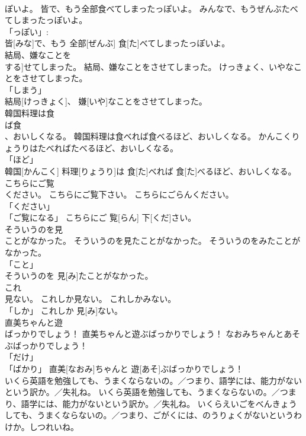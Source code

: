 \documentclass[8pt]{extreport}
\begin{document}
\begin{CJK}{UTF8}{min}
\\	ぽいよ。	皆で、もう全部食べてしまったっぽいよ。	みんなで、もうぜんぶたべてしまったっぽいよ。	
\\	「っぽい」: 
\\	皆[みな]で、もう 全部[ぜんぶ] 食[た]べてしまったっぽいよ。		
\\	結局、嫌なことを
\\	する]せてしまった。	結局、嫌なことをさせてしまった。	けっきょく、いやなことをさせてしまった。	
\\	「しまう」 
\\	結局[けっきょく]、 嫌[いや]なことをさせてしまった。		
\\	韓国料理は食
\\	ば食
\\	、おいしくなる。	韓国料理は食べれば食べるほど、おいしくなる。	かんこくりょうりはたべればたべるほど、おいしくなる。	
\\	「ほど」 
\\	韓国[かんこく] 料理[りょうり]は 食[た]べれば 食[た]べるほど、おいしくなる。		
\\	こちらにご覧
\\	ください。	こちらにご覧下さい。	こちらにごらんください。	
\\	「ください」 
\\	「ご覧になる」	こちらにご 覧[らん] 下[くだ]さい。		
\\	そういうのを見
\\	ことがなかった。	そういうのを見たことがなかった。	そういうのをみたことがなかった。	
\\	「こと」 
\\	そういうのを 見[み]たことがなかった。		
\\	これ
\\	見ない。	これしか見ない。	これしかみない。	
\\	「しか」	これしか 見[み]ない。		
\\	直美ちゃんと遊
\\	ばっかりでしょう！	直美ちゃんと遊ぶばっかりでしょう！	なおみちゃんとあそぶばっかりでしょう！	
\\	「だけ」 
\\	「ばかり」	直美[なおみ]ちゃんと 遊[あそ]ぶばっかりでしょう！		
\\	いくら英語を勉強しても、うまくならないの。／つまり、語学には、能力がないという訳か。／失礼ね。	いくら英語を勉強しても、うまくならないの。／つまり、語学には、能力がないという訳か。／失礼ね。	いくらえいごをべんきょうしても、うまくならないの。／つまり、ごがくには、のうりょくがないというわけか。しつれいね。	

\end{CJK}
\end{document}
